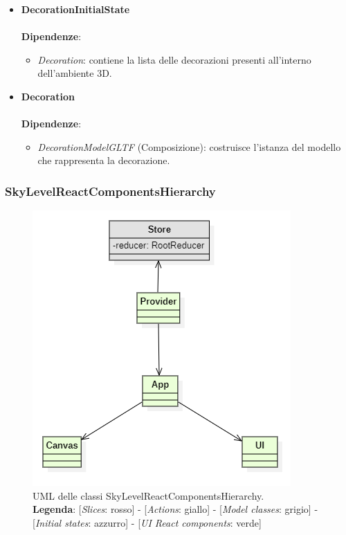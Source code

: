 \begin{itemize}
		\item \textbf{DecorationInitialState}
		\\\\
		\textbf{Dipendenze}:
		\begin{itemize}
			\item \textit{Decoration}: contiene la lista delle decorazioni presenti all'interno dell'ambiente 3D.
		\end{itemize}

		\item \textbf{Decoration}
		\\\\
		\textbf{Dipendenze}:
		\begin{itemize}
			\item \textit{DecorationModelGLTF} (Composizione): costruisce l'istanza del modello che rappresenta la decorazione.
		\end{itemize}
\end{itemize}

\subsubsection{SkyLevelReactComponentsHierarchy}
\begin{figure}[H]
	\centering
	\includegraphics[scale=0.75, keepaspectratio]{./res/images/SkyLevelReactComponentHierarchy.PNG}
	\caption[UML delle classi SkyLevelReactComponentsHierarchy]{
	UML delle classi SkyLevelReactComponentsHierarchy.
	\\
	\textbf{Legenda}: 
	[\textit{Slices}: rosso] -
	[\textit{Actions}: giallo] -
	[\textit{Model classes}: grigio] -
	[\textit{Initial states}: azzurro] -
	[\textit{UI React components}: verde]}
\end{figure}

